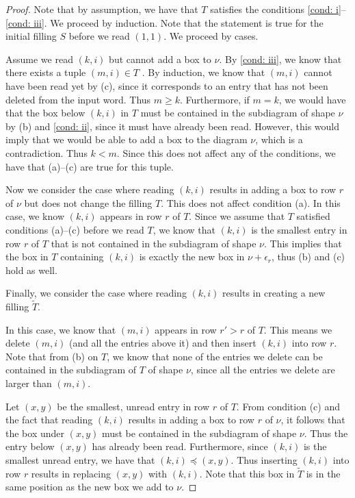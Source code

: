 \documentclass[ALCO, Unicode]{cedram}
\begin{document}
    \begin{proof}
    Note that by assumption, we have that $T$ satisfies the conditions \ref{cond: i}--\ref{cond: iii}. 
    We proceed by induction. Note that the statement is true for the initial filling $S$ before we read $(1,1)$. We proceed by cases.

    Assume we read $(k,i)$ but cannot add a box to $\nu$. By \ref{cond: iii}, we know that there exists a tuple $(m,i)\in T$ . By induction, we know that $(m,i)$ cannot have been read yet by (c), since it corresponds to an entry that has not been deleted from the input word. Thus $m\geq k$.
    Furthermore, if $m=k$, we would have that the box below $(k,i)$ in $T$ must be contained in the subdiagram of shape $\nu$ by (b) and \ref{cond: ii}, since it must have already been read. However, this would imply that we would be able to add a box to the diagram $\nu$, which is a contradiction. Thus $k<m$. Since this does not affect any of the conditions, we have that (a)--(c) are true for this tuple.

    Now we consider the case where reading $(k,i)$ results in adding a box to row $r$ of $\nu$ but does not change the filling $T$.
    This does not affect condition (a).     
    In this case, we know $(k,i)$ appears in row $r$ of $T$. Since we assume that $T$ satisfied conditions (a)--(c) before we read $T$, we know that $(k,i)$ is the smallest entry in row $r$ of $T$ that is not contained in the subdiagram of shape $\nu$. This implies that the box in $T$ containing $(k,i)$ is exactly the new box in $\nu + \epsilon_r$, thus (b) and (c) hold as well. 

    Finally, we consider the case where reading $(k,i)$ results in creating a new filling $\tilde{T}$. 

    In this case, we know that $(m,i)$ appears in row $r'>r$ of $T$.
    This means we delete $(m,i)$ (and all the entries above it) and then insert $(k,i)$ into row $r$. Note that from (b) on $T$, we know that none of the entries we delete can be contained in the subdiagram of $T$ of shape $\nu$, since all the entries we delete are larger than $(m,i)$. 

   Let $(x,y)$ be the smallest, unread entry in row $r$ of $T$. From condition (c) and the fact that reading $(k,i)$ results in adding a box to row $r$ of $\nu$, it follows that the box under $(x,y)$ must be contained in the subdiagram of shape $\nu$. Thus the entry below $(x,y)$ has already been read. Furthermore, since $(k,i)$ is the smallest unread entry, we have that $(k,i)\preceq (x,y)$. Thus inserting $(k,i)$ into row $r$ results in replacing $(x,y)$ with $(k,i)$. Note that this box in $\tilde{T}$ is in the same position as the new box we add to $\nu$. 


\end{proof}
\end{document}
